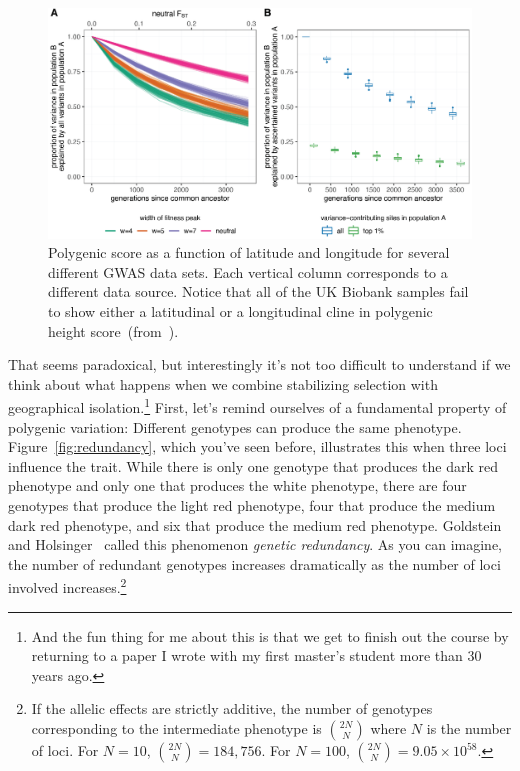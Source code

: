 \begin{figure}
  \begin{center}
    \includegraphics[width=\textwidth]{yair-coop-predictions.eps}
  \end{center}
  \caption{Polygenic score as a function of latitude and longitude for
    several different GWAS data sets. Each vertical column corresponds
  to a different data source. Notice that all of the UK Biobank
  samples fail to show either a latitudinal or a longitudinal cline in
  polygenic height score~(from~\cite{Yair-Coop-2021}).}\label{fig:UK-biobank} 
\end{figure}

That seems paradoxical, but interestingly it's not too difficult to
understand if we think about what happens when we combine stabilizing
selection with geographical isolation.\footnote{And the fun thing for
  me about this is that we get to finish out the course by returning
  to a paper I wrote with my first master's student more than 30 years
  ago.} First, let's remind ourselves of a fundamental property of
polygenic variation: Different genotypes can produce the same
phenotype. Figure~\ref{fig:redundancy}, which you've seen before,
illustrates this when three loci influence the trait. While there is
only one genotype that produces the dark red phenotype and only one
that produces the white phenotype, there are four genotypes that
produce the light red phenotype, four that produce the medium dark red
phenotype, and six that produce the medium red phenotype. Goldstein
and Holsinger~\cite{Goldstein-Holsinger-1992} called this phenomenon
{\it genetic redundancy}. As you can
imagine, the number of redundant genotypes increases dramatically as
the number of loci involved increases.\footnote{If the allelic effects
  are strictly additive, the number of genotypes corresponding to the
  intermediate phenotype is $2N \choose N$ where $N$ is the number of
  loci. For $N=10$, ${2N \choose N} = 184,756$. For $N=100$, ${2N \choose
  N} = 9.05 \times 10^{58}$.}

